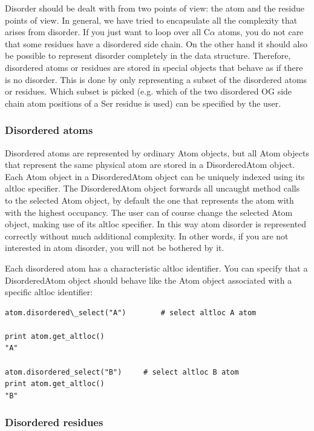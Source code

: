 \documentclass{report}
\begin{document}
Disorder should be dealt with from two points of view: the atom and the residue
points of view. In general, we have tried to encapsulate all the complexity that
arises from disorder. If you just want to loop over all C\( \alpha  \) atoms,
you do not care that some residues have a disordered side chain. On the other
hand it should also be possible to represent disorder completely in the data
structure. Therefore, disordered atoms or residues are stored in special objects
that behave as if there is no disorder. This is done by only representing a
subset of the disordered atoms or residues. Which subset is picked (e.g. which
of the two disordered OG side chain atom positions of a Ser residue is used)
can be specified by the user.


\subsubsection{Disordered atoms\label{disordered atoms}}

Disordered atoms are represented by ordinary Atom objects, but all Atom objects
that represent the same physical atom are stored in a DisorderedAtom object.
Each Atom object in a DisorderedAtom object can be uniquely indexed using its
altloc specifier. The DisorderedAtom object forwards all uncaught method calls
to the selected Atom object, by default the one that represents the atom with
with the highest occupancy. The user can of course change the selected Atom
object, making use of its altloc specifier. In this way atom disorder is represented
correctly without much additional complexity. In other words, if you are not
interested in atom disorder, you will not be bothered by it.

Each disordered atom has a characteristic altloc identifier. You can specify
that a DisorderedAtom object should behave like the Atom object associated with
a specific altloc identifier:

\begin{verbatim}
atom.disordered\_select("A")		# select altloc A atom

print atom.get_altloc()
"A"

atom.disordered_select("B")	   	# select altloc B atom
print atom.get_altloc()
"B"
\end{verbatim}

\subsubsection{Disordered residues}
\end{document}
